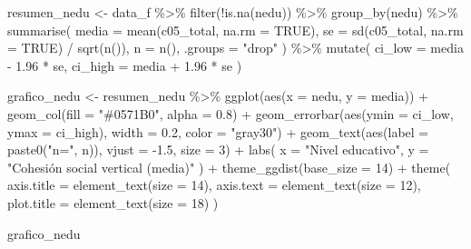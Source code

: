\documentclass[
  spanish,
  a4paper,
  oneside]{scrbook}
\newenvironment{Shaded}{\begin{snugshade}}{\end{snugshade}}
\newcommand{\AttributeTok}[1]{\textcolor[rgb]{0.40,0.45,0.13}{#1}}
\newcommand{\ConstantTok}[1]{\textcolor[rgb]{0.56,0.35,0.01}{#1}}
\newcommand{\DecValTok}[1]{\textcolor[rgb]{0.68,0.00,0.00}{#1}}
\newcommand{\FloatTok}[1]{\textcolor[rgb]{0.68,0.00,0.00}{#1}}
\newcommand{\FunctionTok}[1]{\textcolor[rgb]{0.28,0.35,0.67}{#1}}
\newcommand{\NormalTok}[1]{\textcolor[rgb]{0.00,0.23,0.31}{#1}}
\newcommand{\OtherTok}[1]{\textcolor[rgb]{0.00,0.23,0.31}{#1}}
\newcommand{\SpecialCharTok}[1]{\textcolor[rgb]{0.37,0.37,0.37}{#1}}
\newcommand{\StringTok}[1]{\textcolor[rgb]{0.13,0.47,0.30}{#1}}
\begin{document}
\begin{Shaded}
\begin{Highlighting}[]
\NormalTok{resumen\_nedu }\OtherTok{\textless{}{-}}\NormalTok{ data\_f }\SpecialCharTok{\%\textgreater{}\%}
  \FunctionTok{filter}\NormalTok{(}\SpecialCharTok{!}\FunctionTok{is.na}\NormalTok{(nedu)) }\SpecialCharTok{\%\textgreater{}\%}
  \FunctionTok{group\_by}\NormalTok{(nedu) }\SpecialCharTok{\%\textgreater{}\%}
  \FunctionTok{summarise}\NormalTok{(}
    \AttributeTok{media   =} \FunctionTok{mean}\NormalTok{(c05\_total, }\AttributeTok{na.rm =} \ConstantTok{TRUE}\NormalTok{),}
    \AttributeTok{se      =} \FunctionTok{sd}\NormalTok{(c05\_total, }\AttributeTok{na.rm =} \ConstantTok{TRUE}\NormalTok{) }\SpecialCharTok{/} \FunctionTok{sqrt}\NormalTok{(}\FunctionTok{n}\NormalTok{()),}
    \AttributeTok{n       =} \FunctionTok{n}\NormalTok{(),}
    \AttributeTok{.groups =} \StringTok{"drop"}
\NormalTok{  ) }\SpecialCharTok{\%\textgreater{}\%}
  \FunctionTok{mutate}\NormalTok{(}
    \AttributeTok{ci\_low  =}\NormalTok{ media }\SpecialCharTok{{-}} \FloatTok{1.96} \SpecialCharTok{*}\NormalTok{ se,}
    \AttributeTok{ci\_high =}\NormalTok{ media }\SpecialCharTok{+} \FloatTok{1.96} \SpecialCharTok{*}\NormalTok{ se}
\NormalTok{  )}

\NormalTok{grafico\_nedu }\OtherTok{\textless{}{-}}\NormalTok{ resumen\_nedu }\SpecialCharTok{\%\textgreater{}\%}
  \FunctionTok{ggplot}\NormalTok{(}\FunctionTok{aes}\NormalTok{(}\AttributeTok{x =}\NormalTok{ nedu, }\AttributeTok{y =}\NormalTok{ media)) }\SpecialCharTok{+}
  \FunctionTok{geom\_col}\NormalTok{(}\AttributeTok{fill =} \StringTok{"\#0571B0"}\NormalTok{, }\AttributeTok{alpha =} \FloatTok{0.8}\NormalTok{) }\SpecialCharTok{+}
  \FunctionTok{geom\_errorbar}\NormalTok{(}\FunctionTok{aes}\NormalTok{(}\AttributeTok{ymin =}\NormalTok{ ci\_low, }\AttributeTok{ymax =}\NormalTok{ ci\_high),}
                \AttributeTok{width =} \FloatTok{0.2}\NormalTok{, }\AttributeTok{color =} \StringTok{"gray30"}\NormalTok{) }\SpecialCharTok{+}
  \FunctionTok{geom\_text}\NormalTok{(}\FunctionTok{aes}\NormalTok{(}\AttributeTok{label =} \FunctionTok{paste0}\NormalTok{(}\StringTok{"n="}\NormalTok{, n)), }\AttributeTok{vjust =} \SpecialCharTok{{-}}\FloatTok{1.5}\NormalTok{, }\AttributeTok{size =} \DecValTok{3}\NormalTok{) }\SpecialCharTok{+}
  \FunctionTok{labs}\NormalTok{(}
    \AttributeTok{x =} \StringTok{"Nivel educativo"}\NormalTok{,}
    \AttributeTok{y =} \StringTok{"Cohesión social vertical (media)"}
\NormalTok{  ) }\SpecialCharTok{+}
  \FunctionTok{theme\_ggdist}\NormalTok{(}\AttributeTok{base\_size =} \DecValTok{14}\NormalTok{) }\SpecialCharTok{+}
  \FunctionTok{theme}\NormalTok{(}
    \AttributeTok{axis.title =} \FunctionTok{element\_text}\NormalTok{(}\AttributeTok{size =} \DecValTok{14}\NormalTok{),}
    \AttributeTok{axis.text  =} \FunctionTok{element\_text}\NormalTok{(}\AttributeTok{size =} \DecValTok{12}\NormalTok{),}
    \AttributeTok{plot.title =} \FunctionTok{element\_text}\NormalTok{(}\AttributeTok{size =} \DecValTok{18}\NormalTok{)}
\NormalTok{  )}

\NormalTok{grafico\_nedu}
\end{Highlighting}
\end{Shaded}
\end{document}

